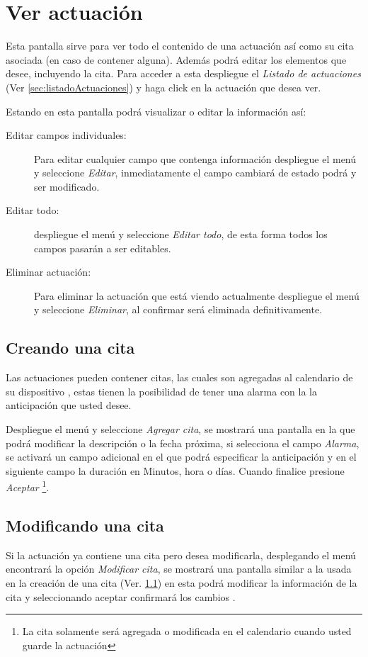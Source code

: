 \section{Ver actuaci\'on}
\label{sec:verActuacion}
Esta pantalla sirve para ver todo el contenido de una actuaci\'on as\'i como
su cita asociada (en caso de contener alguna). Adem\'as podr\'a editar los
elementos que desee, incluyendo la cita. Para acceder a esta despliegue el
\emph{Listado de actuaciones} (Ver \ref{sec:listadoActuaciones}) y haga click
en la actuaci\'on que desea ver.

Estando en esta pantalla podr\'a visualizar o editar la informaci\'on as\'i:

\begin{description}
\item[Editar campos individuales:]Para editar cualquier campo que contenga
informaci\'on despliegue el men\'u \blackberry y seleccione \emph{Editar},
inmediatamente el campo
cambiar\'a de estado podr\'a y ser modificado.
\item[Editar todo:]despliegue el men\'u \blackberry y seleccione \emph{Editar todo},
de esta forma todos los campos pasar\'an a ser editables.
\item[Eliminar actuaci\'on:]Para eliminar la actuaci\'on que est\'a viendo
actualmente despliegue el men\'u \blackberry y seleccione \emph{Eliminar}, al
confirmar ser\'a eliminada definitivamente.
\end{description}

\guardarVer

\subsection{Creando una cita}
\label{sec:crearCita}
Las actuaciones pueden contener citas, las cuales son agregadas al calendario
de su dispositivo \blackberry, estas tienen la posibilidad de tener una alarma
con la la anticipaci\'on que usted desee.

Despliegue el men\'u \blackberry y seleccione \emph{Agregar cita}, se mostrar\'a una
pantalla en la que podr\'a modificar la descripci\'on o la fecha pr\'oxima,
si selecciona el campo \emph{Alarma}, se activar\'a un campo adicional en el
que podr\'a especificar la anticipaci\'on y en el siguiente campo la duraci\'on
en Minutos, hora o d\'ias. Cuando finalice presione \emph{Aceptar}
\footnote{La cita solamente ser\'a agregada o modificada en el calendario cuando
usted guarde la actuaci\'on}.

\subsection{Modificando una cita}
\label{sec:modificarCita}
Si la actuaci\'on ya contiene una cita pero desea modificarla, desplegando el
men\'u \blackberry encontrar\'a la opci\'on \emph{Modificar cita}, se
mostrar\'a una pantalla similar a la usada en la creaci\'on de una cita (Ver.
\ref{sec:crearCita}) en esta podr\'a modificar la informaci\'on de la cita
y seleccionando aceptar confirmar\'a los cambios
\footnotemark[\value{footnote}].

